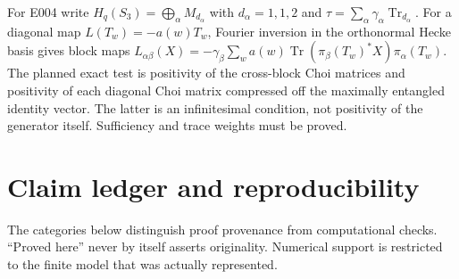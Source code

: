 \documentclass[11pt]{article}
\theoremstyle{remark}\newtheorem{remark}[definition]{Remark}
\newcommand{\Tr}{\operatorname{Tr}}
\begin{document}
For E004 write $H_q(S_3)=\bigoplus_\alpha M_{d_\alpha}$ with
$d_\alpha=1,1,2$ and $\tau=\sum_\alpha\gamma_\alpha\Tr_{d_\alpha}$.
For a diagonal map $L(T_w)=-a(w)T_w$, Fourier inversion in the orthonormal
Hecke basis gives block maps
$L_{\alpha\beta}(X)=-\gamma_\beta\sum_w a(w)
\Tr(\pi_\beta(T_w)^*X)\pi_\alpha(T_w)$.
The planned exact test is positivity of the cross-block Choi matrices and
positivity of each diagonal Choi matrix compressed off the maximally entangled
identity vector. The latter is an infinitesimal condition, not positivity
of the generator itself. Sufficiency and trace weights must be proved.



\section{Claim ledger and reproducibility}
The categories below distinguish proof provenance from computational checks.
``Proved here'' never by itself asserts originality. Numerical support is
restricted to the finite model that was actually represented.
\end{document}
